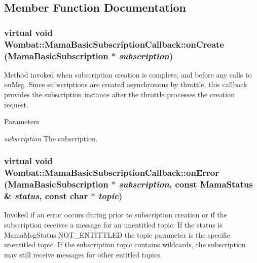 \subsection{Member Function Documentation}
\hypertarget{classWombat_1_1MamaBasicSubscriptionCallback_ab0bb7b11c7b81d411b23e73edfddfd9b}{
\subsubsection[{onCreate}]{\setlength{\rightskip}{0pt plus 5cm}virtual void Wombat::MamaBasicSubscriptionCallback::onCreate ({\bf MamaBasicSubscription} $\ast$ {\em subscription})}}
\label{classWombat_1_1MamaBasicSubscriptionCallback_ab0bb7b11c7b81d411b23e73edfddfd9b}


Method invoked when subscription creation is complete, and before any calls to {\ttfamily onMsg}. Since subscriptions are created asynchronous by throttle, this callback provides the subscription instance after the throttle processes the creation request.


\begin{DoxyParams}{Parameters}
\item[{\em subscription}]The subscription. \end{DoxyParams}
\hypertarget{classWombat_1_1MamaBasicSubscriptionCallback_a55eee815114faaccdb9a21cbfa230683}{
\subsubsection[{onError}]{\setlength{\rightskip}{0pt plus 5cm}virtual void Wombat::MamaBasicSubscriptionCallback::onError ({\bf MamaBasicSubscription} $\ast$ {\em subscription}, \/  const {\bf MamaStatus} \& {\em status}, \/  const char $\ast$ {\em topic})}}
\label{classWombat_1_1MamaBasicSubscriptionCallback_a55eee815114faaccdb9a21cbfa230683}


Invoked if an error occurs during prior to subscription creation or if the subscription receives a message for an unentitled topic. If the status is {\ttfamily MamaMsgStatus.NOT\_\-ENTITTLED} the topic parameter is the specific unentitled topic. If the subscription topic contains wildcards, the subscription may still receive messages for other entitled topics.


